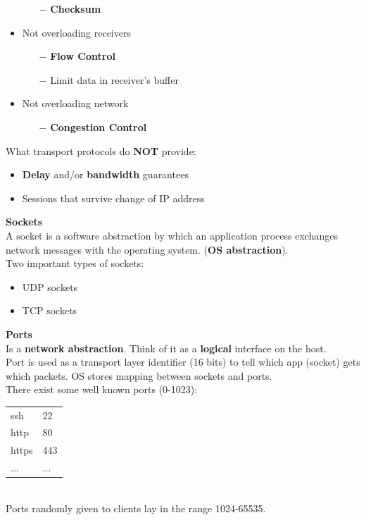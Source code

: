 \documentclass[a4paper, fontsize=8pt, landscape, DIV=1]{scrartcl}
\begin{document}
\begin{multicols*}{4}
\begin{itemize}[noitemsep]
\begin{itemize}
				\item[$-$] \textbf{Checksum}
			\end{itemize}
			\item Not overloading receivers
			\begin{itemize}
				\item[$-$] \textbf{Flow Control}
				\item[$-$] Limit data in receiver's buffer
			\end{itemize}
			\item Not overloading network
			\begin{itemize}
				\item[$-$] \textbf{Congestion Control}
			\end{itemize}
		\end{itemize}
		What transport protocols do \textbf{NOT} provide:
		\begin{itemize}[noitemsep]
			\item \textbf{Delay} and/or \textbf{bandwidth} guarantees
			\item Sessions that survive change of IP address
		\end{itemize}
		\textbf{Sockets}\\
		A socket is a software abstraction by which an application process exchanges
		network messages with the operating system. (\textbf{OS abstraction}).\\
		Two important types of sockets: 
		\begin{itemize}[noitemsep]
			\item UDP sockets
			\item TCP sockets
		\end{itemize}
		\par 
		
		\textbf{Ports}\\
		Is a \textbf{network abstraction}. Think of it as a \textbf{logical} interface
		on the host.\\
		Port is used as a transport layer identifier (16 bits) to tell which app
		(socket) gets which packets. OS stores mapping between sockets and ports.\\
		There exist some well known ports (0-1023):
		\begin{tabular}{l l}
			ssh & 22\\
			http & 80\\
			https & 443\\
			... & ...\\
		\end{tabular}\\
		Ports randomly given to clients lay in the range 1024-65535. 

\end{multicols*}
\end{document}
